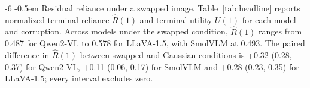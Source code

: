 \documentclass[graybox]{svmult}
\makeatletter
\newcommand{\checknum}[2]{#1}
\renewcommand\paragraph{\@startsection{paragraph}{4}{\z@}%
  {-6\p@ \@plus -2\p@ \@minus -2\p@}%
  {-0.5em}%
  {\normalfont\normalsize\bfseries}}
\makeatother
\begin{document}
\paragraph{Residual reliance under a swapped image.}
Table~\ref{tab:headline} reports normalized terminal reliance
$\hat R(1)$ and terminal utility $U(1)$ for each model and corruption.
Across models under the swapped condition, $\hat R(1)$ ranges from
\checknum{0.487}{Qwen:swapblend:R_hat_s1} for Qwen2-VL to
\checknum{0.578}{llava:swapblend:R_hat_s1} for LLaVA-1.5, with SmolVLM at
\checknum{0.493}{SmolVLM:swapblend:R_hat_s1}.
The paired difference in $\hat{R}(1)$ between swapped and Gaussian conditions is
\checknum{+0.32}{paired:Qwen:delta_rhat} (\checknum{0.28}{paired:Qwen:ci_lo}, \checknum{0.37}{paired:Qwen:ci_hi}) for Qwen2-VL,
\checknum{+0.11}{paired:SmolVLM:delta_rhat} (\checknum{0.06}{paired:SmolVLM:ci_lo}, \checknum{0.17}{paired:SmolVLM:ci_hi}) for SmolVLM and
\checknum{+0.28}{paired:llava:delta_rhat} (\checknum{0.23}{paired:llava:ci_lo}, \checknum{0.35}{paired:llava:ci_hi}) for LLaVA-1.5;
every interval excludes zero.
\end{document}
